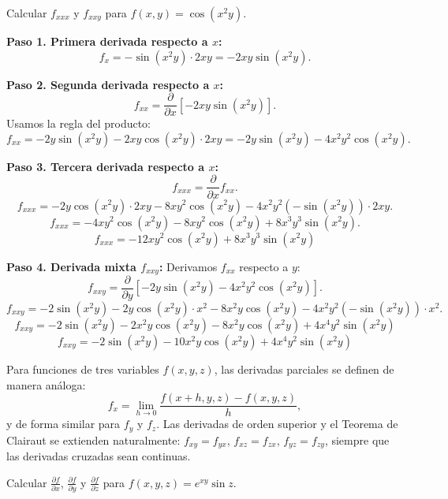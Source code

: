 \begin{example}
Calcular $f_{xxx}$ y $f_{xxy}$ para $f(x,y)=\cos(x^2 y)$.
\end{example}

\begin{myproof}
\textbf{Paso 1. Primera derivada respecto a $x$:}
\[
f_x = -\sin(x^2 y)\cdot 2xy = -2xy\sin(x^2 y).
\]

\textbf{Paso 2. Segunda derivada respecto a $x$:}
\[
f_{xx} = \frac{\partial}{\partial x}[-2xy\sin(x^2 y)].
\]
Usamos la regla del producto:
\[
f_{xx} = -2y\sin(x^2 y) - 2xy\cos(x^2 y)\cdot 2xy
= -2y\sin(x^2 y) - 4x^2 y^2 \cos(x^2 y).
\]

\textbf{Paso 3. Tercera derivada respecto a $x$:}
\[
f_{xxx} = \frac{\partial}{\partial x} f_{xx}.
\]
\[
f_{xxx} = -2y\cos(x^2 y)\cdot 2xy
-8xy^2\cos(x^2 y) - 4x^2 y^2(-\sin(x^2 y))\cdot 2xy.
\]
\[
f_{xxx} = -4xy^2\cos(x^2 y) - 8xy^2\cos(x^2 y)
+ 8x^3 y^3 \sin(x^2 y).
\]
\[
\boxed{f_{xxx} = -12xy^2\cos(x^2 y) + 8x^3 y^3 \sin(x^2 y)}
\]

\textbf{Paso 4. Derivada mixta $f_{xxy}$:}
Derivamos $f_{xx}$ respecto a $y$:
\[
f_{xxy} = \frac{\partial}{\partial y}[-2y\sin(x^2 y) - 4x^2 y^2 \cos(x^2 y)].
\]
\[
f_{xxy} = -2\sin(x^2 y) - 2y\cos(x^2 y)\cdot x^2
-8x^2 y\cos(x^2 y) - 4x^2 y^2 (-\sin(x^2 y))\cdot x^2.
\]
\[
\boxed{f_{xxy} = -2\sin(x^2 y) - 2x^2 y\cos(x^2 y)
-8x^2 y\cos(x^2 y) + 4x^4 y^2\sin(x^2 y)}
\]
\[
\boxed{f_{xxy} = -2\sin(x^2 y) -10x^2 y\cos(x^2 y)
+ 4x^4 y^2\sin(x^2 y)}
\]
\end{myproof}


Para funciones de tres variables $f(x,y,z)$, las derivadas parciales
se definen de manera análoga:
\[
f_x = \lim_{h\to 0}\frac{f(x+h,y,z)-f(x,y,z)}{h},
\]
y de forma similar para $f_y$ y $f_z$. Las derivadas de orden
superior y el Teorema de Clairaut se extienden naturalmente:
$f_{xy}=f_{yx}$, $f_{xz}=f_{zx}$, $f_{yz}=f_{zy}$, siempre que las
derivadas cruzadas sean continuas.

\begin{example}
Calcular $\frac{\partial f}{\partial x}$, $\frac{\partial f}{\partial y}$
y $\frac{\partial f}{\partial z}$ para $f(x,y,z)=e^{xy}\sin z$.
\end{example}

